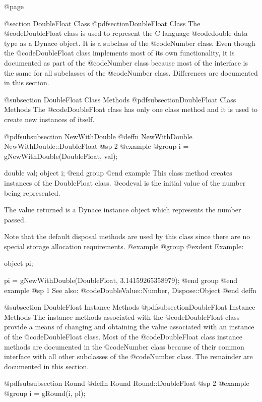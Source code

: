 @page

@section DoubleFloat Class
@pdfsection{DoubleFloat Class}
The @code{DoubleFloat} class is used to represent the C language
@code{double} data type as a Dynace object.  It is a subclass of the
@code{Number} class.  Even though the @code{DoubleFloat} class
implements most of its own functionality, it is documented as part of
the @code{Number} class because most of the interface is the same for
all subclasses of the @code{Number} class.  Differences are documented
in this section.






@subsection DoubleFloat Class Methods
@pdfsubsection{DoubleFloat Class Methods}
The @code{DoubleFloat} class has only one class method and it is used to
create new instances of itself.



@pdfsubsubsection {NewWithDouble}
@deffn {NewWithDouble} NewWithDouble::DoubleFloat
@sp 2
@example
@group
i = gNewWithDouble(DoubleFloat, val);

double  val;
object  i;
@end group
@end example
This class method creates instances of the DoubleFloat class.  @code{val}
is the initial value of the number being represented.  

The value returned is a Dynace instance object which represents the number
passed.

Note that the default disposal methods are used by this class since
there are no special storage allocation requirements.
@example
@group
@exdent Example:

object  pi;

pi = gNewWithDouble(DoubleFloat, 3.14159265358979);
@end group
@end example
@sp 1
See also:  @code{DoubleValue::Number, Dispose::Object}
@end deffn





@subsection DoubleFloat Instance Methods
@pdfsubsection{DoubleFloat Instance Methods}
The instance methods associated with the @code{DoubleFloat} class provide
a means of changing and obtaining the value associated with an instance
of the @code{DoubleFloat} class.  Most of the @code{DoubleFloat} class
instance methods are documented in the @code{Number} class because of
their common interface with all other subclasses of the @code{Number}
class.  The remainder are documented in this section.




 
@pdfsubsubsection {Round}
@deffn {Round} Round::DoubleFloat
@sp 2
@example
@group
i = gRound(i, pl);

